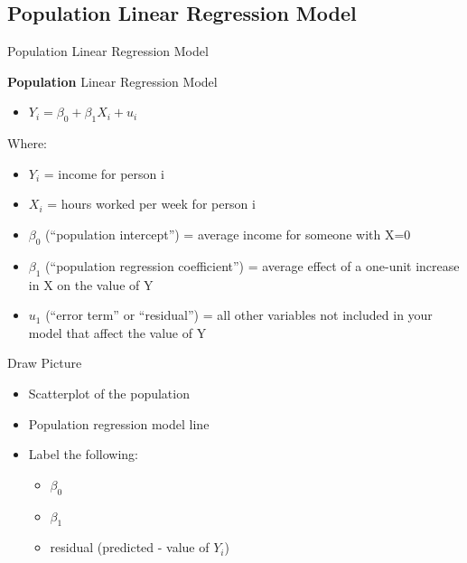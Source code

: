\documentclass[
  8pt,
  ignorenonframetext,
  dvipsnames]{beamer}
\providecommand{\tightlist}{%
  \setlength{\itemsep}{0pt}\setlength{\parskip}{0pt}}
\renewcommand{\textbf}[1]{{\color{darkgray}\bfseries\fontfamily{Montserrat-TOsF}#1}}
\let\olditem\item
\renewcommand{\item}{%
  \olditem\vspace{4pt}
}
\begin{document}
\hypertarget{population-linear-regression-model}{%
\subsection{Population Linear Regression
Model}\label{population-linear-regression-model}}

\begin{frame}{Population Linear Regression Model}
\protect\hypertarget{population-linear-regression-model-1}{}

\textbf{Population} Linear Regression Model

\begin{itemize}
\tightlist
\item
  \(Y_i = \beta_0 + \beta_1X_i + u_i\)
\end{itemize}

\medskip

Where:

\begin{itemize}
\tightlist
\item
  \(Y_i\) = income for person i
\item
  \(X_i\) = hours worked per week for person i
\item
  \(\beta_0\) (``population intercept'') = average income for someone
  with X=0
\item
  \(\beta_1\) (``population regression coefficient'') = average effect
  of a one-unit increase in X on the value of Y
\item
  \(u_1\) (``error term'' or ``residual'') = all other variables not
  included in your model that affect the value of Y
\end{itemize}

\medskip

Draw Picture

\begin{itemize}
\tightlist
\item
  Scatterplot of the population
\item
  Population regression model line
\item
  Label the following:

  \begin{itemize}
  \tightlist
  \item
    \(\beta_0\)
  \item
    \(\beta_1\)
  \item
    residual (predicted - value of \(Y_i\))
  \end{itemize}
\end{itemize}

\end{frame}
\end{document}
